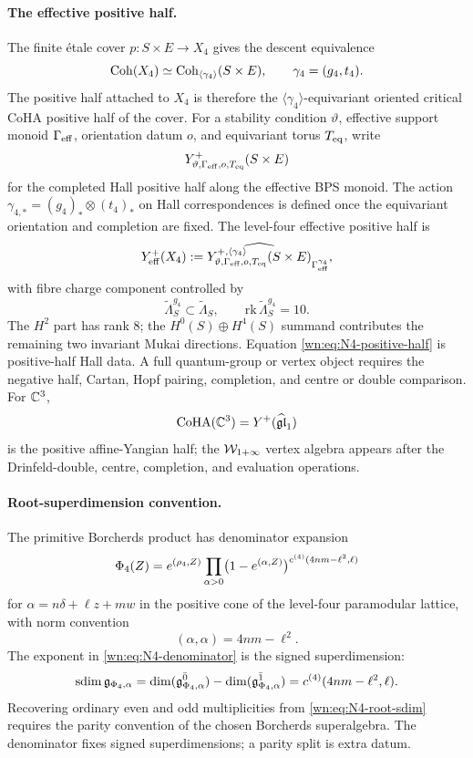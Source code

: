 \paragraph{The effective positive half.}
The finite \'etale cover $p:S\times E\to X_4$ gives the descent
equivalence
\[
  \mathrm{Coh}(X_4)\simeq \mathrm{Coh}_{\langle\gamma_4\rangle}(S\times E),
  \qquad \gamma_4=(g_4,t_4).
\]
The positive half attached to $X_4$ is therefore the
$\langle\gamma_4\rangle$-equivariant oriented critical CoHA positive
half of the cover.  For a stability condition $\vartheta$, effective
support monoid $\Gamma_{\mathrm{eff}}$, orientation datum $o$, and equivariant
torus $T_{\mathrm{eq}}$, write
\[
  Y^+_{\vartheta,\Gamma_{\mathrm{eff}},o,T_{\mathrm{eq}}}(S\times E)
\]
for the completed Hall positive half along the effective BPS monoid.
The action
$\gamma_{4,*}=(g_4)_*\otimes(t_4)_*$ on Hall correspondences is defined
once the equivariant orientation and completion are fixed.  The
level-four effective positive half is
\begin{equation}
  Y^+_{\mathrm{eff}}(X_4)
  :=
  \widehat{
    Y^{+,\langle\gamma_4\rangle}_{\vartheta,\Gamma_{\mathrm{eff}},o,T_{\mathrm{eq}}}
    (S\times E)}
  _{\Gamma_{\mathrm{eff}}^{\gamma_4}},
  \label{wn:eq:N4-positive-half}
\end{equation}
with fibre charge component controlled by
\[
  \widetilde\Lambda_S^{g_4}\subset\widetilde\Lambda_S,
  \qquad \mathrm{rk}\,\widetilde\Lambda_S^{g_4}=10 .
\]
The $H^2$ part has rank $8$; the $H^0(S)\oplus H^4(S)$ summand
contributes the remaining two invariant Mukai directions.
Equation \eqref{wn:eq:N4-positive-half} is positive-half Hall data.
A full quantum-group or vertex object requires the negative half,
Cartan, Hopf pairing, completion, and centre or double comparison.  For
$\mathbb{C}^3$,
\[
  \mathrm{CoHA}(\mathbb{C}^3)=Y^+(\widehat{\mathfrak{gl}}_1)
\]
is the positive affine-Yangian half; the $\mathcal{W}_{1+\infty}$ vertex
algebra appears after the Drinfeld-double, centre, completion, and
evaluation operations.

\paragraph{Root-superdimension convention.}
The primitive Borcherds product has denominator expansion
\begin{equation}
  \Phi_4(Z)
  =e^{(\rho_4,Z)}
   \prod_{\alpha>0}
   \bigl(1-e^{(\alpha,Z)}\bigr)^{
     c^{(4)}(4nm-\ell^2,\ell)}
  \label{wn:eq:N4-denominator}
\end{equation}
for $\alpha=n\delta+\ell z+mw$ in the positive cone of the
level-four paramodular lattice, with norm convention
\[
  (\alpha,\alpha)=4nm-\ell^2 .
\]
The exponent in \eqref{wn:eq:N4-denominator} is the signed
superdimension:
\begin{equation}
  \mathrm{sdim}\,\mathfrak{g}_{\Phi_4,\alpha}
  =
  \dim(\mathfrak{g}_{\Phi_4,\alpha}^{\bar 0})
  -
  \dim(\mathfrak{g}_{\Phi_4,\alpha}^{\bar 1})
  =
  c^{(4)}(4nm-\ell^2,\ell).
  \label{wn:eq:N4-root-sdim}
\end{equation}
Recovering ordinary even and odd multiplicities from
\eqref{wn:eq:N4-root-sdim} requires the parity convention of the chosen
Borcherds superalgebra.  The denominator fixes signed
superdimensions; a parity split is extra datum.

